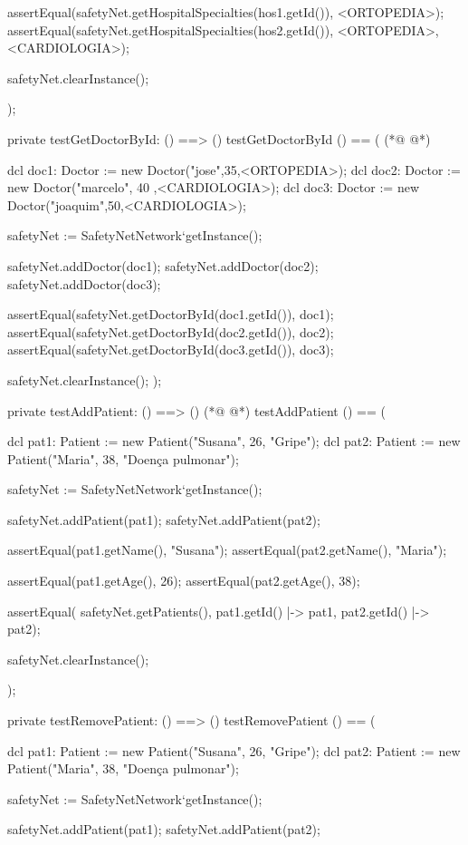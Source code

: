 \begin{vdmpp}[breaklines=true]
  assertEqual(safetyNet.getHospitalSpecialties(hos1.getId()), {<ORTOPEDIA>});
  assertEqual(safetyNet.getHospitalSpecialties(hos2.getId()), {<ORTOPEDIA>, <CARDIOLOGIA>});  
  
  safetyNet.clearInstance();
    
);

private testGetDoctorById: () ==> ()
 testGetDoctorById () == (
(*@
\label{testRemovePatient:497}
@*)
   
  dcl doc1: Doctor := new Doctor("jose",35,<ORTOPEDIA>);
  dcl doc2: Doctor := new Doctor("marcelo", 40 ,<CARDIOLOGIA>);
  dcl doc3: Doctor := new Doctor("joaquim",50,<CARDIOLOGIA>);
  
  safetyNet := SafetyNetNetwork`getInstance();
   
  safetyNet.addDoctor(doc1);
  safetyNet.addDoctor(doc2);
  safetyNet.addDoctor(doc3);
  
  assertEqual(safetyNet.getDoctorById(doc1.getId()), doc1);
  assertEqual(safetyNet.getDoctorById(doc2.getId()), doc2);
  assertEqual(safetyNet.getDoctorById(doc3.getId()), doc3);
 
  safetyNet.clearInstance();
);

private testAddPatient: () ==> ()
(*@
\label{testAddAppointment:516}
@*)
 testAddPatient () == (
 
  dcl pat1: Patient := new Patient("Susana", 26, "Gripe");
  dcl pat2: Patient := new Patient("Maria", 38, "Doença pulmonar");
   
  safetyNet := SafetyNetNetwork`getInstance();
   
  safetyNet.addPatient(pat1);
  safetyNet.addPatient(pat2);
  
  assertEqual(pat1.getName(), "Susana");
  assertEqual(pat2.getName(), "Maria");
  
  assertEqual(pat1.getAge(), 26);
  assertEqual(pat2.getAge(), 38); 

  assertEqual( safetyNet.getPatients(), {pat1.getId() |-> pat1, pat2.getId() |-> pat2});
  
  safetyNet.clearInstance();
    
);

private testRemovePatient: () ==> ()
 testRemovePatient () == (
 
  dcl pat1: Patient := new Patient("Susana", 26, "Gripe");
  dcl pat2: Patient := new Patient("Maria", 38, "Doença pulmonar");
   
  safetyNet := SafetyNetNetwork`getInstance();
   
  safetyNet.addPatient(pat1);
  safetyNet.addPatient(pat2);
  

\end{vdmpp}

